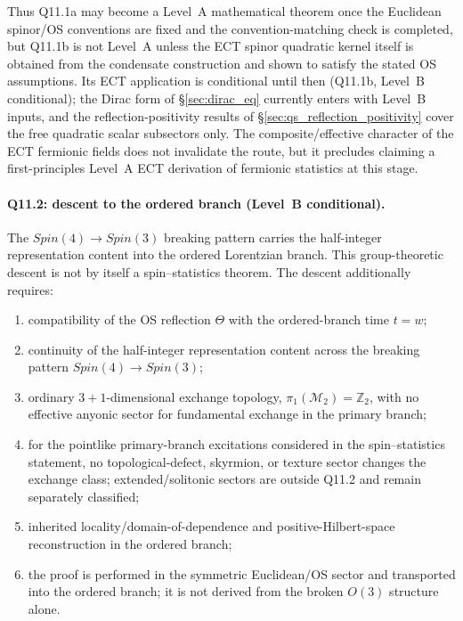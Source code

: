 Thus Q11.1a may become a Level~A mathematical theorem once the
Euclidean spinor/OS conventions are fixed and the convention-matching
check is completed, but Q11.1b is
not Level~A unless the ECT spinor quadratic kernel itself is
obtained from the condensate construction and shown to satisfy the
stated OS assumptions.
Its ECT application is conditional until then (Q11.1b, Level~B
conditional); the Dirac form of \S\ref{sec:dirac_eq} currently
enters with Level~B inputs, and the reflection-positivity results of
\S\ref{sec:qs_reflection_positivity} cover the free quadratic
scalar subsectors only.
The composite/effective character of the ECT fermionic fields does
not invalidate the route, but it precludes claiming a
first-principles Level~A ECT derivation of fermionic statistics at
this stage.


\paragraph{Q11.2: descent to the ordered branch (Level~B
conditional).}
The $Spin(4)\to Spin(3)$ breaking pattern carries the half-integer
representation content into the ordered Lorentzian branch.
This group-theoretic descent is not by itself a spin--statistics
theorem.
The descent additionally requires:
\begin{enumerate}[label=(\roman*)]
  \item compatibility of the OS reflection $\Theta$ with the
    ordered-branch time $t=w$;
  \item continuity of the half-integer representation content
    across the breaking pattern $Spin(4)\to Spin(3)$;
  \item ordinary $3{+}1$-dimensional exchange topology,
    $\pi_1(\mathcal M_2)=\mathbb Z_2$, with no effective anyonic
    sector for fundamental exchange in the primary branch;
  \item for the pointlike primary-branch excitations considered in
    the spin--statistics statement, no topological-defect,
    skyrmion, or texture sector changes the exchange class;
    extended/solitonic sectors are outside Q11.2 and remain
    separately classified;
  \item inherited locality/domain-of-dependence and
    positive-Hilbert-space reconstruction in the ordered branch;
  \item the proof is performed in the symmetric Euclidean/OS sector
    and transported into the ordered branch; it is not derived from
    the broken $O(3)$ structure alone.
\end{enumerate}

